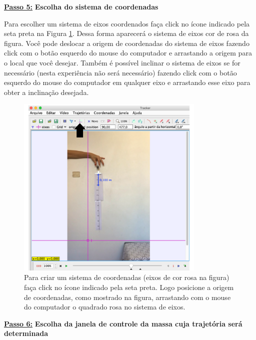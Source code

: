 \documentclass[12pt]{article}
\begin{document}
\underline{\bf Passo 5:} {\bf Escolha do sistema de coordenadas}\\
\indent

Para escolher um sistema de eixos coordenados faça click no ícone indicado pela seta preta na Figura \ref{fig7AppB}. Dessa forma aparecerá o sistema de eixos cor de rosa da figura. Você pode deslocar 
a origem de coordenadas do sistema de eixos fazendo click com o botão esquerdo do mouse do computador e arrastando a origem para o local que você desejar. Também é possível inclinar o sistema de eixos se for necessário (nesta experiência não será necessário) fazendo click com o botão esquerdo do mouse do computador em qualquer eixo e arrastando esse eixo para obter a inclinação desejada.

\begin{figure}[h!]
\includegraphics[width=9cm]{fig7AppB.pdf}
\caption{Para criar um sistema de coordenadas (eixos de cor rosa na figura) faça click no ícone indicado pela seta preta. Logo posicione a origem de coordenadas, como mostrado na figura, arrastando com o mouse do computador o quadrado rosa no sistema de eixos.}
\label{fig7AppB}
\end{figure}

\underline{\bf Passo 6:} {\bf Escolha da janela de controle da massa cuja trajetória
será determinada}\\
\indent
\end{document}
